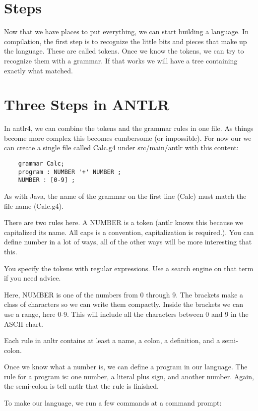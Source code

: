 \section{Steps}

Now that we have places to put everything, we can start building a language.
In compilation, the first step is to recognize the little bits and pieces
that make up the language. These are called tokens. Once we know the
tokens, we can try to recognize them with a grammar. If that works we
will have a tree containing exactly what matched.

\section{Three Steps in ANTLR}

In antlr4, we can combine the tokens and the grammar rules in one file.
As things become more complex this becomes cumbersome (or impossible).
For now our we can create a single file called Calc.g4 under
src/main/antlr with this content:

{\footnotesize
\begin{verbatim}
    grammar Calc;
    program : NUMBER '+' NUMBER ;
    NUMBER : [0-9] ;
\end{verbatim}
}

As with Java, the name of the grammar on the first line (Calc) must
match the file name (Calc.g4).

There are two rules here. A NUMBER is a token (antlr knows this because
we capitalized its name. All caps is a convention, capitalization is required.).
You can define number in a lot of ways, all of the other ways will be
more interesting that this.

You specify the tokens with regular expressions. Use a search engine on
that term if you need advice.

Here, NUMBER is one of the numbers from 0 through 9. The brackets
make a class of characters so we can write them compactly. Inside the
brackets we can use a range, here 0-9. This will include all the
characters between 0 and 9 in the ASCII chart.

Each rule in anltr contains at least a name, a colon, a definition,
and a semi-colon.

Once we know what a number is, we can define a program in our language.
The rule for a program is: one number, a literal plus sign, and another
number. Again, the semi-colon is tell antlr that the rule is finished.

To make our language, we run a few commands at a command prompt:

